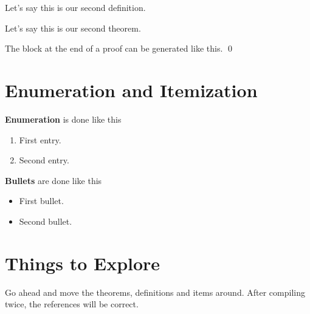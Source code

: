 \begin{definition}
\label{def2}

Let's say this is our second definition.

\end{definition}

\begin{theorem}
\label{th2}

Let's say this is our second theorem.

\end{theorem}

The block at the end of a proof can be generated like this. \qed



\section{Enumeration and Itemization}

{\bf Enumeration} is done like this

\begin{enumerate}
\item
\label{en1}
First entry.

\item
\label{en2}
Second entry.

\end{enumerate}


{\bf Bullets} are done like this

\begin{itemize}
\item
First bullet.

\item
Second bullet.

\end{itemize}





\section{Things to Explore}
\label{explore}

Go ahead and move the theorems, definitions and items around.
After compiling twice, the references will be correct.

